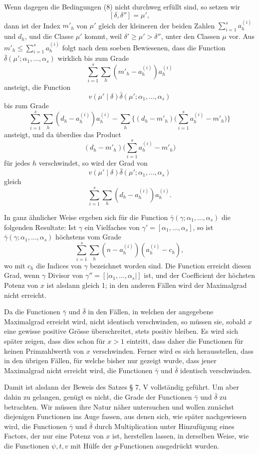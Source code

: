 \documentclass[11pt,a4paper]{article}
\begin{document}
Wenn dagegen die Bedingungen (8) nicht durchweg erfüllt sind, so setzen wir
\[
 [\delta,\delta'']=\mu',
\]
dann ist der Index $m'_h$ von $\mu'$ gleich der kleineren der beiden Zahlen $\sum_{i=1}^s a_h^{(i)}$ und $d_h$, und die Classe $\mu'$ kommt, weil $\delta'\ge\mu'>\delta''$, unter den Classen $\mu$ vor. Aus $m'_h\le\sum_{i=1}^s a_h^{(i)}$ folgt nach dem soeben Bewiesenen, dass die Function $\bar\delta(\mu';\alpha_1,
\ldots,\alpha_s)$ wirklich bis zum Grade
\[
 \sum_{i=1}^s\sum_h(m'_h-a_h^{(i)})a_h^{(i)}
\]
ansteigt, die Function
\[
 v(\mu'\mid\delta)\bar\delta(\mu';\alpha_1,\ldots,\alpha_s)
\]
bis zum Grade
\[
 \sum_{i=1}^s\sum_h(d_h-a_h^{(i)})a_h^{(i)}
 -\sum_h\biggl\{(d_h-m'_h)\biggl(\sum_{i=1}^s a_h^{(i)}-m'_h\biggr)\biggr\}
\]
ansteigt, und da überdies das Product
\[
 (d_h-m'_h)\biggl(\sum_{i=1}^s a_h^{(i)}-m'_h\biggr)
\]
für jedes $h$ verschwindet, so wird der Grad von
\[
 v(\mu'\mid\delta)\bar\delta(\mu';\alpha_1,
\ldots,\alpha_s)
\]
gleich
\[
 \sum_{i=1}^s\sum_h(d_h-a_h^{(i)})a_h^{(i)}.
\]

In ganz ähnlicher Weise ergeben sich für die Function $\bar\gamma(\gamma;\alpha_1,
\ldots,\alpha_s)$ die folgenden Resultate: Ist $\gamma$ ein Vielfaches von $\gamma'=[\alpha_1,
\ldots,\alpha_s]$, so ist $\bar\gamma(\gamma;\alpha_1,
\ldots,\alpha_s)$ höchstens vom Grade
\begin{equation}
 \sum_{i=1}^s\sum_h(n-a_h^{(i)})(a_h^{(i)}-c_h),
\tag{10}
\end{equation}
wo mit $c_h$ die Indices von $\gamma$ bezeichnet worden sind. Die Function erreicht diesen Grad, wenn $\gamma$ Divisor von $\gamma''=[|\alpha_1,
\ldots,\alpha_s|]$ ist, und der Coefficient der höchsten Potenz von $x$ ist alsdann gleich 1; in den anderen Fällen wird der Maximalgrad nicht erreicht.

Da die Functionen $\bar\gamma$ und $\bar\delta$ in den Fällen, in welchen der angegebene Maximalgrad erreicht wird, nicht identisch verschwinden, so müssen sie, sobald $x$ eine gewisse positive Grösse überschreitet, stets positiv bleiben. Es wird sich später zeigen, dass dies schon für $x>1$ eintritt, dass daher die Functionen für keinen Primzahlwerth von $x$ verschwinden. Ferner wird es sich herausstellen, dass in den übrigen Fällen, für welche bisher nur gezeigt wurde, dass jener Maximalgrad nicht erreicht wird, die Functionen $\bar\gamma$ und $\bar\delta$ identisch verschwinden.

Damit ist alsdann der Beweis des Satzes § 7, V vollständig geführt. Um aber dahin zu gelangen, genügt es nicht, die Grade der Functionen $\bar\gamma$ und $\bar\delta$ zu betrachten. Wir müssen ihre Natur näher untersuchen und wollen zunächst diejenigen Functionen ins Auge fassen, aus denen sich, wie später nachgewiesen wird, die Functionen $\bar\gamma$ und $\bar\delta$ durch Multiplication unter Hinzufügung eines Factors, der nur eine Potenz von $x$ ist, herstellen lassen, in derselben Weise, wie die Functionen $\psi,t,v$ mit Hülfe der $g$-Functionen ausgedrückt wurden.
\end{document}
